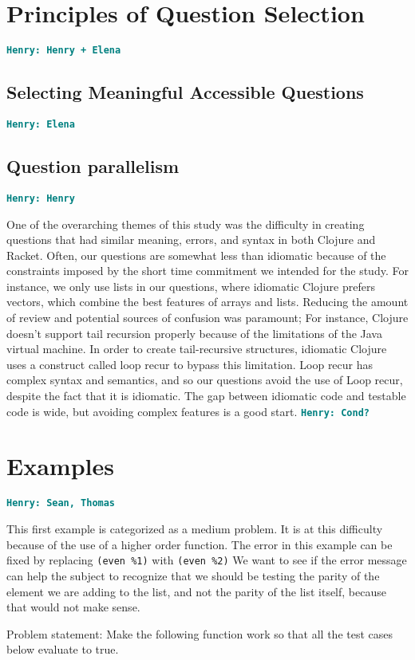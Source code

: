 \documentclass[12pt]{article}
\newcommand{\comment}[1]{{\bf \tt  {#1}}}
\newcommand{\hfcomment}[1]{\textcolor{Teal}{\comment{Henry: {#1}}}}
\begin{document}
\section{Principles of Question Selection}\label{sec:select}
	\hfcomment{Henry + Elena}
	\subsection{Selecting Meaningful Accessible Questions}\label{sec:meaning}
	\hfcomment{Elena}
	\subsection{Question parallelism}\label{sec:parallel}
	\hfcomment{Henry}
	
	One of the overarching themes of this study was the difficulty in creating questions that had similar meaning, errors, and syntax in both Clojure and Racket. 
	Often, our questions are somewhat less than idiomatic because of the constraints imposed by the short time commitment we intended for the study.
	For instance, we only use lists in our questions, where idiomatic Clojure prefers vectors, which combine the best features of arrays and lists.
	 Reducing the amount of review and potential sources of confusion was paramount; For instance, Clojure doesn't support tail recursion properly because of the limitations of the Java virtual machine.
	 In order to create tail-recursive structures, idiomatic Clojure uses a construct called loop recur to bypass this limitation.
	 Loop recur has complex syntax and semantics, and so our questions avoid the use of Loop recur, despite the fact that it is idiomatic. 
	 The gap between idiomatic code and testable code is wide, but avoiding complex features is a good start. \hfcomment{Cond?}
\section{Examples}\label{sec:examples}
	\hfcomment{Sean, Thomas}
	
	This first example is categorized as a medium problem. 
	It is at this difficulty because of the use of a higher order function.
	The error in this example can be fixed by replacing \texttt{(even \%1)} with \texttt{(even \%2)} 
	We want to see if the error message can help the subject to recognize that we should be testing the parity of the element we are adding to the list, and not the parity of the list itself, because that would not make sense. 
	
	Problem statement:
		Make the following function work so that all the test cases below evaluate to true.
	
\end{document}

